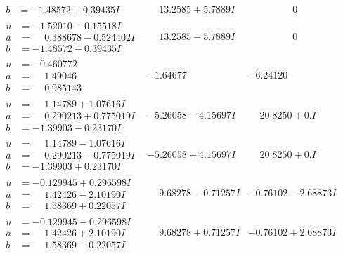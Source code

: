 \documentclass[1p]{elsarticle_modified}
\theoremstyle{definition}
\begin{document}
$$\begin{array}{c|c|c}
\begin{aligned}
b &= -1.48572 + 0.39435 I\end{aligned}
 & \phantom{-}13.2585 + 5.7889 I & \phantom{-0.000000 } 0 \\ \hline\begin{aligned}
u &= -1.52010 - 0.15518 I \\
a &= \phantom{-}0.388678 - 0.524402 I \\
b &= -1.48572 - 0.39435 I\end{aligned}
 & \phantom{-}13.2585 - 5.7889 I & \phantom{-0.000000 } 0 \\ \hline\begin{aligned}
u &= -0.460772\phantom{ +0.000000I} \\
a &= \phantom{-}1.49046\phantom{ +0.000000I} \\
b &= \phantom{-}0.985143\phantom{ +0.000000I}\end{aligned}
 & -1.64677\phantom{ +0.000000I} & -6.24120\phantom{ +0.000000I} \\ \hline\begin{aligned}
u &= \phantom{-}1.14789 + 1.07616 I \\
a &= \phantom{-}0.290213 + 0.775019 I \\
b &= -1.39903 - 0.23170 I\end{aligned}
 & -5.26058 - 4.15697 I & \phantom{-}20.8250 + 0. I\phantom{ +0.000000I} \\ \hline\begin{aligned}
u &= \phantom{-}1.14789 - 1.07616 I \\
a &= \phantom{-}0.290213 - 0.775019 I \\
b &= -1.39903 + 0.23170 I\end{aligned}
 & -5.26058 + 4.15697 I & \phantom{-}20.8250 + 0. I\phantom{ +0.000000I} \\ \hline\begin{aligned}
u &= -0.129945 + 0.296598 I \\
a &= \phantom{-}1.42426 - 2.10190 I \\
b &= \phantom{-}1.58369 + 0.22057 I\end{aligned}
 & \phantom{-}9.68278 - 0.71257 I & -0.76102 - 2.68873 I \\ \hline\begin{aligned}
u &= -0.129945 - 0.296598 I \\
a &= \phantom{-}1.42426 + 2.10190 I \\
b &= \phantom{-}1.58369 - 0.22057 I\end{aligned}
 & \phantom{-}9.68278 + 0.71257 I & -0.76102 + 2.68873 I \\ \hline\begin{aligned}

\end{aligned}
\end{array}$$
\end{document}
